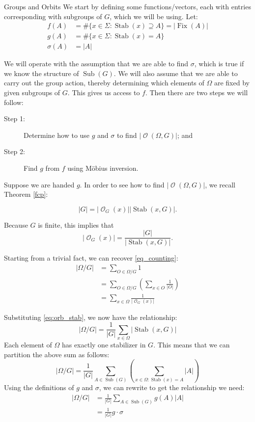 \documentclass[12pt]{pom_thesis}
\DeclareMathOperator{\fix}{Fix}
\DeclareMathOperator{\sub}{Sub}
\DeclareMathOperator{\stab}{Stab}
\DeclareMathOperator{\orb}{\mathcal{O}}
\begin{document}
\begin{chapter}{Groups and Orbits}
We start by defining some functions/vectors, each with entries corresponding with subgroups of $G$, which we will be using. Let:
\begin{align*}
f(A) &= \#\{x \in \Sigma: \stab(x) \supseteq A\} = |\fix(A)|\\
g(A) &= \#\{x \in \Sigma: \stab(x) = A\}\\
\sigma(A) &= |A|
\end{align*}

We will operate with the assumption that we are able to find $\sigma$, which is true if we know the structure of $\sub(G)$. We will also assume that we are able to carry out the group action, thereby determining which elements of $\Omega$ are fixed by given subgroups of $G$. This gives us access to $f$. Then there are two steps we will follow:
\begin{description}
\item[Step 1:] Determine how to use $g$ and $\sigma$ to find $|\orb(\Omega, G)|$; and
\item[Step 2:] Find $g$ from $f$ using M\"obius inversion.
\end{description}

Suppose we are handed $g$. In order to see how to find $|\orb(\Omega, G)|$, we recall Theorem \ref{fcp}:

\[|G| = |\orb_G(x)||\stab(x, G)|.\]

Because $G$ is finite, this implies that \begin{equation}|\orb_G(x)| = \frac{|G|}{|\stab(x, G)|}.\end{equation} \label{eq:orb_stab}

Starting from a trivial fact, we can recover \eqref{eq_counting}:
\begin{align*}
|\Omega/G| &= \sum_{O \in \Omega/G}1\\
&= \sum_{O \in \Omega/G}\left(\sum_{x \in O}\frac{1}{|O|}\right)\\
&= \sum_{x \in \Omega}\frac{1}{|\orb_G(x)|}
\end{align*}

Substituting \eqref{eq:orb_stab}, we now have the relationship:
\[
|\Omega/G| = \frac{1}{|G|}\sum_{x \in \Omega}|\stab(x, G)|
\]
Each element of $\Omega$ has exactly one stabilizer in $G$. This means that we can partition the above sum as follows:
\[
|\Omega/G| = \frac{1}{|G|}\sum_{A \in \sub(G)}\left(\sum_{x \in \Omega: \stab(x) = A}|A|\right)
\]
Using the definitions of $g$ and $\sigma$, we can rewrite to get the relationship we need:
\begin{align*}
|\Omega/G| &= \frac{1}{|G|}\sum_{A \in \sub(G)}g(A)|A|\\
&= \frac {1}{|G|}g \cdot \sigma
\end{align*}


\end{chapter}
\end{document}
